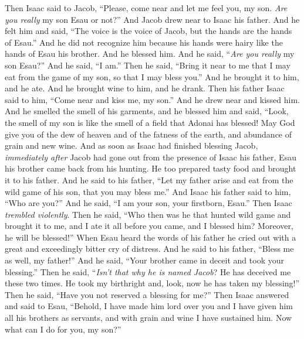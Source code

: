 \begin{biblechapter}
\verse Then Isaac said to Jacob, “Please, come near and let me feel you, my son. \textit{Are you really} my son Esau or not?”
\verse And Jacob drew near to Isaac his father. And he felt him and said, “The voice is the voice of Jacob, but the hands are the hands of Esau.”
\verse And he did not recognize him because his hands were hairy like the hands of Esau his brother. And he blessed him.
\verse And he said, “\textit{Are you really} my son Esau?” And he said, “I am.”
\verse Then he said, “Bring it near to me that I may eat from the game of my son, so that I may bless you.” And he brought it to him, and he ate. And he brought wine to him, and he drank.
\verse Then his father Isaac said to him, “Come near and kiss me, my son.”
\verse And he drew near and kissed him. And he smelled the smell of his garments, and he blessed him and said,
\verse “Look, the smell of my son is like the smell of a field that Adonai has blessed!
\verse May God give you of the dew of heaven 
and of the fatness of the earth, 
and abundance of grain and new wine.
\verse And as soon as Isaac had finished blessing Jacob, \textit{immediately after} Jacob had gone out from the presence of Isaac his father, Esau his brother came back from his hunting.
\verse He too prepared tasty food and brought it to his father. And he said to his father, “Let my father arise and eat from the wild game of his son, that you may bless me.”
\verse And Isaac his father said to him, “Who are you?” And he said, “I am your son, your firstborn, Esau.”
\verse Then Isaac \textit{trembled violently}. Then he said, “Who then was he that hunted wild game and brought it to me, and I ate it all before you came, and I blessed him? Moreover, he will be blessed!”
\verse When Esau heard the words of his father he cried out with a great and exceedingly bitter cry of distress. And he said to his father, “Bless me as well, my father!”
\verse And he said, “Your brother came in deceit and took your blessing.”
\verse Then he said, “\textit{Isn’t that why he is named Jacob}? He has deceived me these two times. He took my birthright and, look, now he has taken my blessing!” Then he said, “Have you not reserved a blessing for me?”
\verse Then Isaac answered and said to Esau, “Behold, I have made him lord over you and I have given him all his brothers as servants, and with grain and wine I have sustained him. Now what can I do for you, my son?”

\end{biblechapter}
